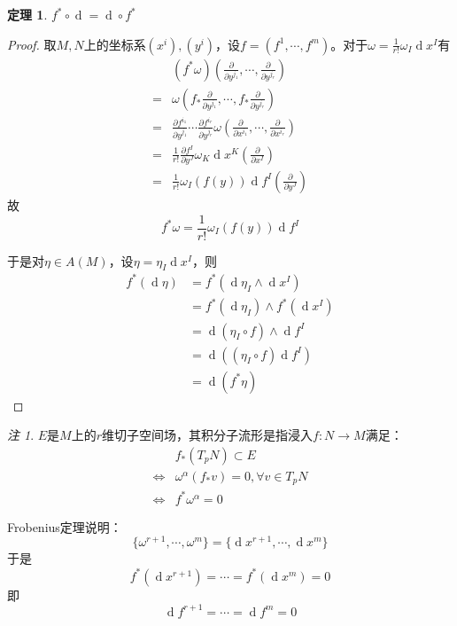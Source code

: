 \documentclass[winfonts,UTF8,c5size,a4paper,fancyhdr,hyperref,titlepage,nocap]{ctexart}
\newtheorem{thm}{定理}
\theoremstyle{definition}
\theoremstyle{remark}
\newtheorem*{rem}{注}
\numberwithin{equation}{subsection}
\newcommand{\dd}{\operatorname{d}}
\newcommand{\pfrac}[2]{\frac{\partial{#1}}{\partial{#2}}}
\begin{document}
\begin{thm}
  $f^{\ast}\circ\dd=\dd\circ f^{\ast}$
\end{thm}
\begin{proof}
  取$M,N$上的坐标系$(x^i),(y^i)$，设$f=(f^1,\cdots,f^m)$。对于$\omega=\frac{1}{r!}\omega_I\dd x^I$有
\begin{align*}
  &(f^{\ast}\omega)(\pfrac{}{y^{j_1}},\cdots,\pfrac{}{y^{j_r}})\\
 =&\omega(f_{\ast}\pfrac{}{y^{j_1}},\cdots,f_{\ast}\pfrac{}{y^{j_r}})\\
 =&\pfrac{f^{i_1}}{y^{j_1}}\cdots\pfrac{f^{i_r}}{y^{j_r}}\omega(\pfrac{}{x^{i_1}},\cdots,\pfrac{}{x^{i_r}})\\
 =&\frac{1}{r!}\pfrac{f^I}{y^J}\omega_K\dd x^K(\pfrac{}{x^I})\\
 =&\frac{1}{r!}\omega_I(f(y))\dd f^I(\pfrac{}{y^J})
\end{align*}
故
\begin{equation*}
f^{\ast}\omega=\frac{1}{r!}\omega_I(f(y))\dd f^I
\end{equation*}

于是对$\eta\in A(M)$，设$\eta=\eta_I\dd x^I$，则
\begin{align*}
f^{\ast}(\dd\eta)&=f^{\ast}(\dd\eta_I\wedge\dd x^I)\\
                 &=f^{\ast}(\dd\eta_I)\wedge f^{\ast}(\dd x^I)\\
                 &=\dd(\eta_I\circ f)\wedge\dd f^I\\
                 &=\dd((\eta_I\circ f)\dd f^I)\\
                 &=\dd(f^{\ast}\eta)
\end{align*}
\end{proof}
\begin{rem}
$E$是$M$上的$r$维切子空间场，其积分子流形是指浸入$f\colon N\to M$满足：
\begin{align*}
  &f_{\ast}(T_pN)\subset E\\
\Longleftrightarrow&\omega^{\alpha}(f_{\ast}v)=0, \forall v\in T_pN\\
\Longleftrightarrow&f^{\ast}\omega^{\alpha}=0
\end{align*}

Frobenius定理说明：
\begin{equation*}
\{\omega^{r+1},\cdots,\omega^m\}=\{\dd x^{r+1},\cdots,\dd x^m\}
\end{equation*}
于是
\begin{equation*}
f^{\ast}(\dd x^{r+1})=\cdots=f^{\ast}(\dd x^{m})=0
\end{equation*}
即
\begin{equation*}
\dd f^{r+1}=\cdots=\dd f^{m}=0
\end{equation*}
\end{rem}
\end{document}
